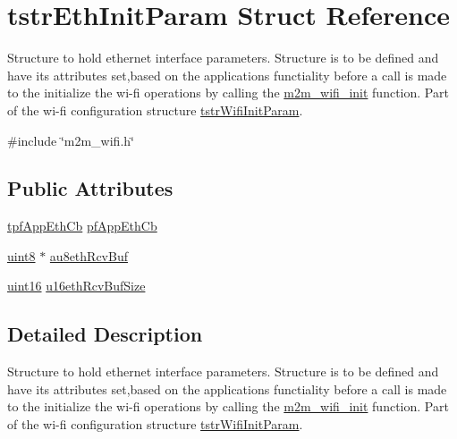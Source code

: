 \hypertarget{structtstrEthInitParam}{}\section{tstr\+Eth\+Init\+Param Struct Reference}
\label{structtstrEthInitParam}


Structure to hold ethernet interface parameters. Structure is to be defined and have its attributes set,based on the application\textquotesingle{}s functiality before a call is made to the initialize the wi-\/fi operations by calling the \hyperlink{group__WifiInitFn_ga73c734812e844d96d860c4e93e9daf35}{m2m\+\_\+wifi\+\_\+init} function. Part of the wi-\/fi configuration structure \hyperlink{structtstrWifiInitParam}{tstr\+Wifi\+Init\+Param}.  




{\ttfamily \#include \char`\"{}m2m\+\_\+wifi.\+h\char`\"{}}

\subsection*{Public Attributes}
\begin{DoxyCompactItemize}
\item 
\hyperlink{group__WlanEnums_ga9dda38bbac67906396ad1b1e0419502d}{tpf\+App\+Eth\+Cb} \hyperlink{group__WifiSetCustInfoElementFn_gaf4ff856212372005fe5b3ef30c6e8d7d}{pf\+App\+Eth\+Cb}
\item 
\hyperlink{group__DataT_ga4df709a77647e870bbf1d955b8edc9a6}{uint8} $\ast$ \hyperlink{group__WifiSetCustInfoElementFn_gaa0328252052cf33e1ca7c695e238a067}{au8eth\+Rcv\+Buf}
\item 
\hyperlink{group__DataT_ga1daa745171fc6e31d942c161422a76f9}{uint16} \hyperlink{group__WifiSetCustInfoElementFn_ga536ae78324c98515266f493c81da12ab}{u16eth\+Rcv\+Buf\+Size}
\end{DoxyCompactItemize}


\subsection{Detailed Description}
Structure to hold ethernet interface parameters. Structure is to be defined and have its attributes set,based on the application\textquotesingle{}s functiality before a call is made to the initialize the wi-\/fi operations by calling the \hyperlink{group__WifiInitFn_ga73c734812e844d96d860c4e93e9daf35}{m2m\+\_\+wifi\+\_\+init} function. Part of the wi-\/fi configuration structure \hyperlink{structtstrWifiInitParam}{tstr\+Wifi\+Init\+Param}. 


